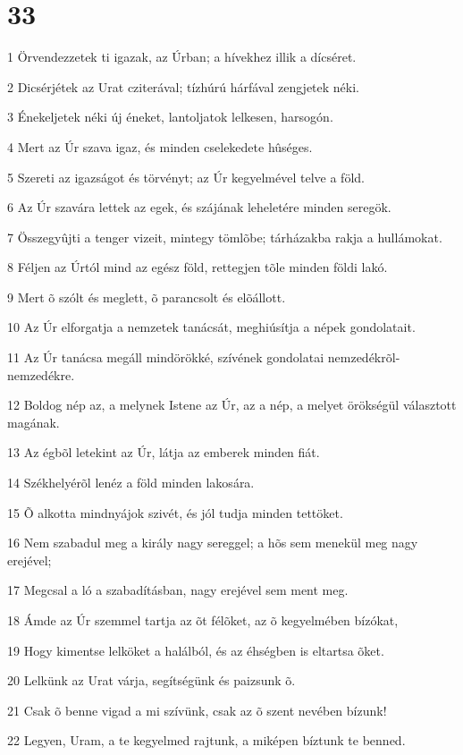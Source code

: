 \chapter{33}

\par 1 Örvendezzetek ti igazak, az Úrban; a hívekhez illik a dícséret.
\par 2 Dicsérjétek az Urat cziterával; tízhúrú hárfával zengjetek néki.
\par 3 Énekeljetek néki új éneket, lantoljatok lelkesen, harsogón.
\par 4 Mert az Úr szava igaz, és minden cselekedete hûséges.
\par 5 Szereti az igazságot és törvényt; az Úr kegyelmével telve a föld.
\par 6 Az Úr szavára lettek az egek, és szájának leheletére minden seregök.
\par 7 Összegyûjti a tenger vizeit, mintegy tömlõbe; tárházakba rakja a hullámokat.
\par 8 Féljen az Úrtól mind az egész föld, rettegjen tõle minden földi lakó.
\par 9 Mert õ szólt és meglett, õ parancsolt és elõállott.
\par 10 Az Úr elforgatja a nemzetek tanácsát, meghiúsítja a népek gondolatait.
\par 11 Az Úr tanácsa megáll mindörökké, szívének gondolatai nemzedékrõl-nemzedékre.
\par 12 Boldog nép az, a melynek Istene az Úr, az a nép, a melyet örökségül választott magának.
\par 13 Az égbõl letekint az Úr, látja az emberek minden fiát.
\par 14 Székhelyérõl lenéz a föld minden lakosára.
\par 15 Õ alkotta mindnyájok szivét, és jól tudja minden tettöket.
\par 16 Nem szabadul meg a király nagy sereggel; a hõs sem menekül meg nagy erejével;
\par 17 Megcsal a ló a szabadításban, nagy erejével sem ment meg.
\par 18 Ámde az Úr szemmel tartja az õt félõket, az õ kegyelmében bízókat,
\par 19 Hogy kimentse lelköket a halálból, és az éhségben is eltartsa õket.
\par 20 Lelkünk az Urat várja, segítségünk és paizsunk õ.
\par 21 Csak õ benne vigad a mi szívünk, csak az õ szent nevében bízunk!
\par 22 Legyen, Uram, a te kegyelmed rajtunk, a miképen bíztunk te benned.

